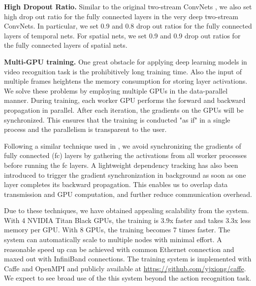 \documentclass[10pt,twocolumn,letterpaper]{article}
\begin{document}
\textbf{High Dropout Ratio.} Similar to the original two-stream ConvNets \cite{SimonyanZ14}, we also set high drop out ratio for the fully connected layers in the very deep two-stream ConvNets. In particular, we set 0.9 and 0.8 drop out ratios for the fully connected layers of temporal nets. For spatial nets, we set 0.9 and 0.9 drop out ratios for the fully connected layers of spatial nets.

\textbf{Multi-GPU training.}  One great obstacle for applying deep learning models in video recognition task is the prohibitively long training time. Also the input of multiple frames heightens the memory consumption for storing layer activations. We solve these problems by employing multiple GPUs in the data-parallel manner. 
During training, each worker GPU performs the forward and backward propagation in parallel. After each iteration, the gradients on the GPUs will be synchronized. This ensures that the training is conducted "as if" in a single process and the parallelism is transparent to the user.

Following a similar technique used in \cite{HeArxiv2015}, we avoid synchronizing the gradients of fully connected (fc) layers by gathering the activations from all worker processes before running the fc layers. 
A lightweight dependency tracking has also been introduced to trigger the gradient synchronization in background as soon as one layer completes its backward propagation.
This enables us to overlap data transmission and GPU computation, and further reduce communication overhead.

Due to these techniques, we have obtained appealing scalability from the system. With 4 NVIDIA Titan Black GPUs, the training is 3.9x faster and takes 3.3x less memory per GPU. With 8 GPUs, the training becomes 7 times faster. The system can automatically scale to multiple nodes with minimal effort. A reasonable speed up can be achieved with common Ethernet connection and maxed out with InfiniBand connections. The training system is implemented with Caffe and OpenMPI and publicly available at \url{https://github.com/yjxiong/caffe}. We expect to see broad use of the this system beyond the action recognition task.
\end{document}
